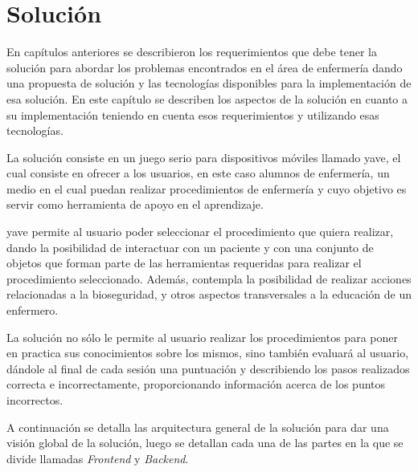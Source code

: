 \chapter{Solución}
\label{chap:solucion}



En capítulos anteriores se describieron los requerimientos que debe tener la 
solución para abordar los problemas encontrados en el área de enfermería dando 
una propuesta de solución y las tecnologías disponibles para la implementación 
de esa solución. En este capítulo se describen los aspectos de la solución 
en cuanto a su implementación teniendo en cuenta esos requerimientos y 
utilizando esas tecnologías.

La solución consiste en un juego serio para dispositivos móviles llamado \Gls{yave}, el cual 
consiste en ofrecer a los usuarios, en este caso alumnos de enfermería, un medio en 
el cual puedan realizar procedimientos de enfermería y cuyo objetivo es servir como 
herramienta de apoyo en el aprendizaje.

\Gls{yave} permite al usuario poder seleccionar el procedimiento que quiera
realizar, dando la posibilidad de interactuar con un paciente y con una conjunto
de objetos que forman parte de las herramientas requeridas para realizar el
procedimiento seleccionado. Además, contempla la posibilidad de realizar
acciones relacionadas a la bioseguridad, y otros aspectos transversales a la
educación de un enfermero.

La solución no sólo le permite al usuario realizar los procedimientos para
poner en practica sus conocimientos sobre los mismos, sino también evaluará al
usuario, dándole al final de cada sesión una puntuación y describiendo los
pasos realizados correcta e incorrectamente, proporcionando información acerca
de los puntos incorrectos.

A continuación se detalla las arquitectura general de la solución para 
dar una visión global de la solución, luego se detallan cada una de las partes en 
la que se divide llamadas \emph{Frontend} y \emph{Backend}.






